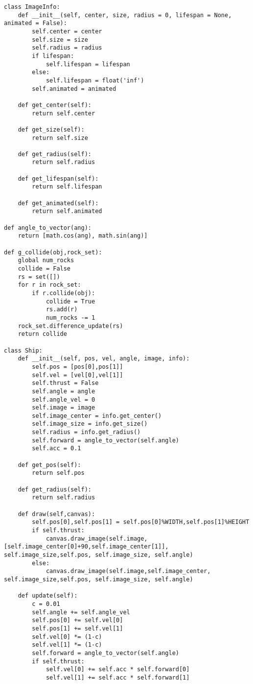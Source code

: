 \documentclass[9pt]{amsart}
\begin{document}
\begin{multicols}{2}
\begin{lstlisting}
class ImageInfo:
    def __init__(self, center, size, radius = 0, lifespan = None, animated = False):
        self.center = center
        self.size = size
        self.radius = radius
        if lifespan:
            self.lifespan = lifespan
        else:
            self.lifespan = float('inf')
        self.animated = animated

    def get_center(self):
        return self.center

    def get_size(self):
        return self.size

    def get_radius(self):
        return self.radius

    def get_lifespan(self):
        return self.lifespan

    def get_animated(self):
        return self.animated

def angle_to_vector(ang):
    return [math.cos(ang), math.sin(ang)]

def g_collide(obj,rock_set):
    global num_rocks
    collide = False
    rs = set([])
    for r in rock_set:
        if r.collide(obj):
            collide = True
            rs.add(r)
            num_rocks -= 1
    rock_set.difference_update(rs)
    return collide 
 
class Ship:
    def __init__(self, pos, vel, angle, image, info):
        self.pos = [pos[0],pos[1]]
        self.vel = [vel[0],vel[1]]
        self.thrust = False
        self.angle = angle
        self.angle_vel = 0
        self.image = image
        self.image_center = info.get_center()
        self.image_size = info.get_size()
        self.radius = info.get_radius()
        self.forward = angle_to_vector(self.angle)
        self.acc = 0.1
        
    def get_pos(self):
        return self.pos
    
    def get_radius(self):
        return self.radius

    def draw(self,canvas):
        self.pos[0],self.pos[1] = self.pos[0]%WIDTH,self.pos[1]%HEIGHT
        if self.thrust:
            canvas.draw_image(self.image,[self.image_center[0]+90,self.image_center[1]], self.image_size,self.pos, self.image_size, self.angle)
        else:
            canvas.draw_image(self.image,self.image_center, self.image_size,self.pos, self.image_size, self.angle)

    def update(self):
        c = 0.01
        self.angle += self.angle_vel
        self.pos[0] += self.vel[0]
        self.pos[1] += self.vel[1]
        self.vel[0] *= (1-c)
        self.vel[1] *= (1-c)
        self.forward = angle_to_vector(self.angle)
        if self.thrust:
            self.vel[0] += self.acc * self.forward[0]
            self.vel[1] += self.acc * self.forward[1]


\end{lstlisting}
\end{multicols}
\end{document}
